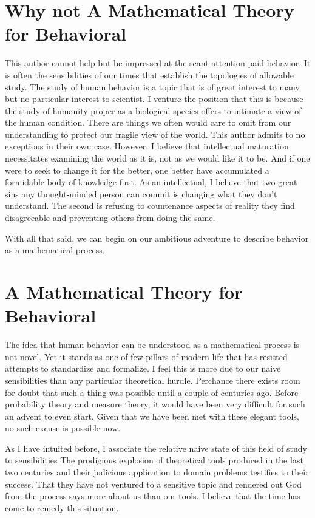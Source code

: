 \documentclass[12pt]{article}
\begin{document}
\tableofcontents

\pagebreak

\section{Why not A Mathematical Theory for Behavioral}
This author cannot help but be impressed at the scant attention paid behavior.
It is often the sensibilities of our times that establish the topologies of allowable study.
The study of human behavior is a topic that is of great interest to many but no particular interest to scientist.
I venture the position that this is because the study of humanity proper as a biological species offers to intimate a view of the human condition.
There are things we often would care to omit from our understanding to protect our fragile view of the world.
This author admits to no exceptions in their own case.
However, I believe that intellectual maturation necessitates examining the world as it is, not as we would like it to be.
And if one were to seek to change it for the better, one better have accumulated a formidable body of knowledge first.
As an intellectual, I believe that two great sins any thought-minded person can commit is changing what they don't understand.
The second is refusing to countenance aspects of reality they find disagreeable and preventing others from doing the same.

With all that said, we can begin on our ambitious adventure to describe behavior as a mathematical process.

\section{A Mathematical Theory for Behavioral}
The idea that human behavior can be understood as a mathematical process is not novel.
Yet it stands as one of few pillars of modern life that has resisted attempts to standardize and formalize.
I feel this is more due to our naive sensibilities than any particular theoretical hurdle.
Perchance there exists room for doubt that such a thing was possible until a couple of centuries ago.
Before probability theory and measure theory, it would have been very difficult for such an advent to even start.
Given that we have been met with these elegant tools, no such excuse is possible now.

As I have intuited before, I associate the relative naive state of this field of study to sensibilities
The prodigious explosion of theoretical tools produced in the last two centuries and their judicious application to domain problems testifies to their success.
That they have not ventured to a sensitive topic and rendered out God from the process says more about us than our tools.
I believe that the time has come to remedy this situation.
\end{document}
